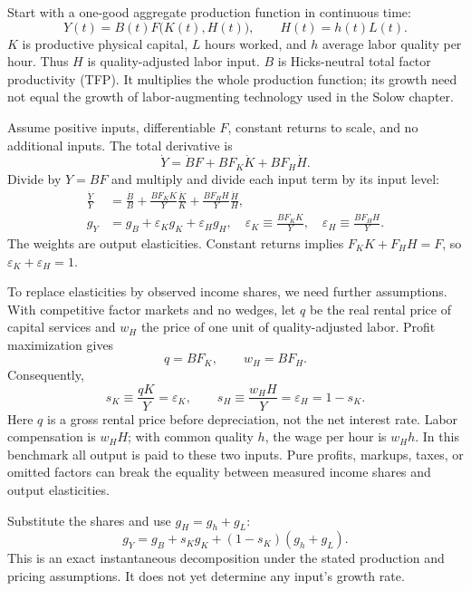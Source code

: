 Start with a one-good aggregate production function in continuous time:
\begin{equation}\label{eq:facts-production}
Y(t)=B(t)F\bigl(K(t),H(t)\bigr),\qquad H(t)=h(t)L(t).
\end{equation}
$K$ is productive physical capital, $L$ hours worked, and $h$ average labor
quality per hour. Thus $H$ is quality-adjusted labor input. $B$ is
Hicks-neutral total factor productivity (TFP). It multiplies the whole
production function; its growth need not equal the growth of labor-augmenting
technology used in the Solow chapter.

Assume positive inputs, differentiable $F$, constant returns to scale, and no
additional inputs. The total derivative is
\begin{equation}
\dot Y=\dot B F+B F_K\dot K+B F_H\dot H.
\end{equation}
Divide by $Y=BF$ and multiply and divide each input term by its input level:
\begin{align}
\frac{\dot Y}{Y}
&=\frac{\dot B}{B}
 +\frac{BF_KK}{Y}\frac{\dot K}{K}
 +\frac{BF_HH}{Y}\frac{\dot H}{H},\\
g_Y&=g_B+\varepsilon_K g_K+\varepsilon_H g_H,
\quad
\varepsilon_K\equiv\frac{BF_KK}{Y},\quad
\varepsilon_H\equiv\frac{BF_HH}{Y}.\label{eq:facts-elasticities}
\end{align}
The weights are output elasticities. Constant returns implies
$F_KK+F_HH=F$, so $\varepsilon_K+\varepsilon_H=1$.

To replace elasticities by observed income shares, we need further assumptions.
With competitive factor markets and no wedges, let $q$ be the real rental price
of capital services and $w_H$ the price of one unit of quality-adjusted labor.
Profit maximization gives
\begin{equation}
q=BF_K,\qquad w_H=BF_H.
\end{equation}
Consequently,
\begin{equation}
s_K\equiv\frac{qK}{Y}=\varepsilon_K,\qquad
s_H\equiv\frac{w_HH}{Y}=\varepsilon_H=1-s_K.
\end{equation}
Here $q$ is a gross rental price before depreciation, not the net interest rate.
Labor compensation is $w_HH$; with common quality $h$, the wage per hour is
$w_Hh$. In this benchmark all output is paid to these two inputs. Pure profits,
markups, taxes, or omitted factors can break the equality between measured
income shares and output elasticities.

Substitute the shares and use $g_H=g_h+g_L$:
\begin{equation}\label{eq:facts-accounting}
\boxed{g_Y=g_B+s_K g_K+(1-s_K)(g_h+g_L).}
\end{equation}
This is an exact instantaneous decomposition under the stated production and
pricing assumptions. It does not yet determine any input's growth rate.


